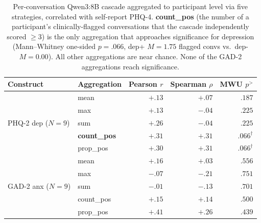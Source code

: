 \documentclass[letterpaper]{article}
\begin{document}
\begin{table}[t]
\small
\centering
\setlength{\tabcolsep}{4pt}
\begin{tabular}{llrrr}
\toprule
Construct & Aggregation & Pearson $r$ & Spearman $\rho$ & MWU $p^{>}$ \\
\midrule
\multirow{5}{*}{PHQ-2 dep ($N=9$)}
 & mean       & $+.13$ & $+.07$ & $.187$ \\
 & max        & $+.13$ & $-.04$ & $.225$ \\
 & sum        & $+.26$ & $-.04$ & $.225$ \\
 & \textbf{count\_pos}  & $\mathbf{+.31}$ & $\mathbf{+.31}$ & $\mathbf{.066}^{\dagger}$ \\
 & prop\_pos  & $+.30$ & $+.31$ & $.066^{\dagger}$ \\
\midrule
\multirow{5}{*}{GAD-2 anx ($N=9$)}
 & mean       & $+.16$ & $+.03$ & $.556$ \\
 & max        & $-.07$ & $-.21$ & $.751$ \\
 & sum        & $-.01$ & $-.13$ & $.701$ \\
 & count\_pos & $+.15$ & $+.14$ & $.500$ \\
 & prop\_pos  & $+.41$ & $+.26$ & $.439$ \\
\bottomrule
\end{tabular}
\caption{Per-conversation Qwen3:8B cascade aggregated to participant level via five strategies, correlated with self-report PHQ-4. \textbf{count\_pos} (the number of a participant's clinically-flagged conversations that the cascade independently scored $\geq 3$) is the only aggregation that approaches significance for depression (Mann--Whitney one-sided $p=.066$, dep+ $M=1.75$ flagged convs vs.\ dep- $M=0.00$). All other aggregations are near chance. None of the GAD-2 aggregations reach significance.}
\label{tab:rq3_v5_aggs}
\end{table}
\end{document}
